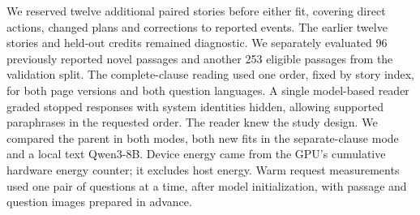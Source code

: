 We reserved twelve additional paired stories before either fit, covering direct actions, changed plans and corrections to reported events. The earlier twelve stories and held-out credits remained diagnostic. We separately evaluated 96 previously reported novel passages and another 253 eligible passages from the validation split. The complete-clause reading used one order, fixed by story index, for both page versions and both question languages. A single model-based reader graded stopped responses with system identities hidden, allowing supported paraphrases in the requested order. The reader knew the study design. We compared the parent in both modes, both new fits in the separate-clause mode and a local text Qwen3-8B. Device energy came from the GPU's cumulative hardware energy counter; it excludes host energy. Warm request measurements used one pair of questions at a time, after model initialization, with passage and question images prepared in advance.
